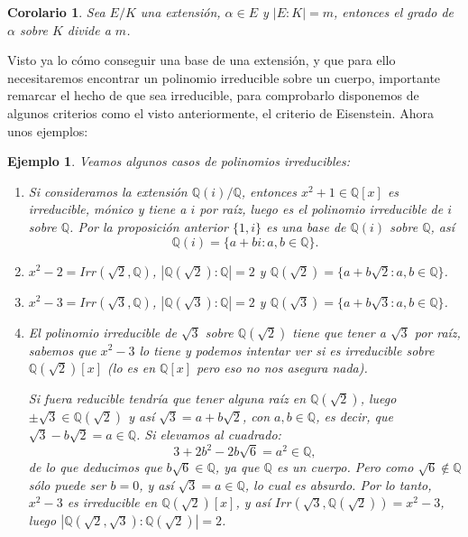 \documentclass[12pt]{article}
\newtheorem{example}{Ejemplo}[theorem]
\newtheorem{corolario}{Corolario}[theorem]
\begin{document}
\begin{corolario} Sea $E/K$ una extensión, $\alpha \in E$ y $|E:K| = m$, entonces el grado de $\alpha$ sobre $K$ divide a $m$.
\end{corolario}
Visto ya lo cómo conseguir una base de una extensión, y que para ello necesitaremos encontrar un polinomio irreducible sobre un cuerpo, importante remarcar el hecho de que sea irreducible, para comprobarlo disponemos de algunos criterios como el visto anteriormente, el criterio de Eisenstein. Ahora unos ejemplos: 

\begin{example} Veamos algunos casos de polinomios irreducibles: \begin{enumerate}
\item Si consideramos la extensión $\mathbb{Q}(i)/\mathbb{Q}$, entonces $x^{2}+1 \in \mathbb{Q}[x]$ es irreducible, mónico y tiene a $i$ por raíz, luego es el polinomio irreducible de $i$ sobre $\mathbb{Q}$. Por la proposición anterior $\lbrace 1, i \rbrace$ es una base de $\mathbb{Q}(i)$ sobre $\mathbb{Q}$, así $$\mathbb{Q}(i) = \lbrace a+bi : a,b \in \mathbb{Q} \rbrace.$$

\item $x^{2}-2 = Irr(\sqrt{2}, \mathbb{Q})$, $|\mathbb{Q}(\sqrt{2}) : \mathbb{Q} | = 2$ y $\mathbb{Q}(\sqrt{2}) = \lbrace a+b\sqrt{2}: a,b \in \mathbb{Q} \rbrace$.
\item $x^{2}-3 = Irr(\sqrt{3}, \mathbb{Q})$, $|\mathbb{Q}(\sqrt{3}) : \mathbb{Q}| = 2$ y $\mathbb{Q}(\sqrt{3}) = \lbrace a+b \sqrt{3}: a,b \in \mathbb{Q} \rbrace$.
\item El polinomio irreducible de $\sqrt{3}$ sobre $\mathbb{Q}(\sqrt{2})$ tiene que tener a $\sqrt{3}$ por raíz, sabemos que $x^{2}-3$ lo tiene y podemos intentar ver si es irreducible sobre $\mathbb{Q}(\sqrt{2})[x]$ (lo es en $\mathbb{Q}[x]$ pero eso no nos asegura nada). 

Si fuera reducible tendría que tener alguna raíz en $\mathbb{Q}(\sqrt{2})$, luego $\pm \sqrt{3} \in \mathbb{Q}(\sqrt{2})$ y así $\sqrt{3} = a+b\sqrt{2}$, con $a,b \in \mathbb{Q}$, es decir, que $\sqrt{3} -b \sqrt{2} = a \in \mathbb{Q}$. Si elevamos al cuadrado: $$3+2b^{2}-2b\sqrt{6} = a^{2} \in \mathbb{Q},$$ de lo que deducimos que $b\sqrt{6} \in \mathbb{Q}$, ya que $\mathbb{Q}$ es un cuerpo. Pero como $\sqrt{6} \notin \mathbb{Q}$ sólo puede ser $b = 0$, y así $\sqrt{3} = a \in \mathbb{Q}$, lo cual es absurdo. Por lo tanto, $x^{2}-3$ es irreducible en $\mathbb{Q}(\sqrt{2})[x]$, y así $Irr(\sqrt{3}, \mathbb{Q}(\sqrt{2}))=x^{2}-3$, luego $|\mathbb{Q}(\sqrt{2}, \sqrt{3}) : \mathbb{Q}(\sqrt{2})| = 2$.
\end{enumerate}
\end{example}
\end{document}
